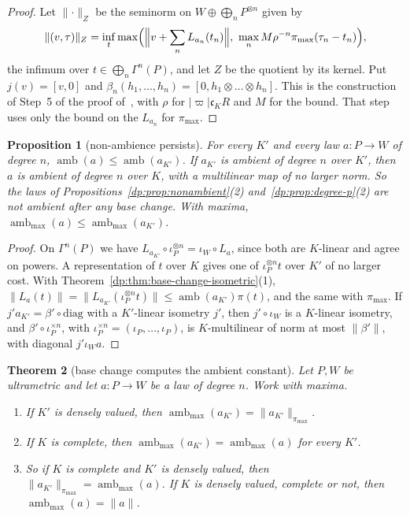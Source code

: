\documentclass[11pt]{amsart}
\newtheorem{theorem}{Theorem}[section]
\newtheorem{proposition}[theorem]{Proposition}
\theoremstyle{definition}
\theoremstyle{remark}
\numberwithin{equation}{section}
\newcommand{\abs}[1]{\lvert #1\rvert}
\newcommand{\norm}[1]{\lVert #1\rVert}
\theoremstyle{plain}
\theoremstyle{definition}
\theoremstyle{plain}
\begin{document}
\begin{proof}
Let $\norm\cdot_Z$ be the seminorm on $W\oplus\bigoplus_nP^{\otimes n}$ given by
\[
 \norm{(v,\tau)}_Z=\inf_t\max\Bigl(\Bigl\lVert v+\sum_nL_{a_n}(t_n)\Bigr\rVert,\ \max_nM\rho^{-n}\pi_{\max}(\tau_n-t_n)\Bigr),
\]
the infimum over $t\in\bigoplus_n\Gamma^n(P)$, and let $Z$ be the quotient by its kernel. Put $j(v)=[v,0]$ and $\beta_n(h_1,\dots,h_n)=[0,h_1\otimes\dots\otimes h_n]$. This is the construction of Step~5 of the proof of~\cite[Theorem~14.39]{I}, with $\rho$ for $\abs\varpi\mathfrak c_KR$ and $M$ for the bound. That step uses only the bound on the $L_{a_n}$ for $\pi_{\max}$.
\end{proof}

\begin{proposition}[non-ambience persists]\label{dp:prop:nonambient-base}
For every $K'$ and every law $a\colon P\to W$ of degree $n$, $\operatorname{amb}(a)\le\operatorname{amb}(a_{K'})$. If $a_{K'}$ is ambient of degree $n$ over $K'$, then $a$ is ambient of degree $n$ over $K$, with a multilinear map of no larger norm. So the laws of Propositions~\ref{dp:prop:nonambient}\textup{(2)} and~\ref{dp:prop:degree-p}\textup{(2)} are not ambient after any base change. With maxima, $\operatorname{amb}_{\max}(a)\le\operatorname{amb}_{\max}(a_{K'})$.
\end{proposition}

\begin{proof}
On $\Gamma^n(P)$ we have $L_{a_{K'}}\circ\iota_P^{\otimes n}=\iota_W\circ L_a$, since both are $K$-linear and agree on powers. A representation of $t$ over $K$ gives one of $\iota_P^{\otimes n}t$ over $K'$ of no larger cost. With Theorem~\ref{dp:thm:base-change-isometric}(1), $\norm{L_a(t)}=\norm{L_{a_{K'}}(\iota_P^{\otimes n}t)}\le\operatorname{amb}(a_{K'})\pi(t)$, and the same with $\pi_{\max}$. If $j'a_{K'}=\beta'\circ\mathrm{diag}$ with a $K'$-linear isometry $j'$, then $j'\circ\iota_W$ is a $K$-linear isometry, and $\beta'\circ\iota_P^{\times n}$, with $\iota_P^{\times n}=(\iota_P,\dots,\iota_P)$, is $K$-multilinear of norm at most $\norm{\beta'}$, with diagonal $j'\iota_Wa$.
\end{proof}

\begin{theorem}[base change computes the ambient constant]\label{dp:thm:base-change-amb}
Let $P,W$ be ultrametric and let $a\colon P\to W$ be a law of degree $n$. Work with maxima.
\begin{enumerate}
\item If $K'$ is densely valued, then $\operatorname{amb}_{\max}(a_{K'})=\norm{a_{K'}}_{\pi_{\max}}$.
\item If $K$ is complete, then $\operatorname{amb}_{\max}(a_{K'})=\operatorname{amb}_{\max}(a)$ for every $K'$.
\item So if $K$ is complete and $K'$ is densely valued, then $\norm{a_{K'}}_{\pi_{\max}}=\operatorname{amb}_{\max}(a)$. If $K$ is densely valued, complete or not, then $\operatorname{amb}_{\max}(a)=\norm a$.
\end{enumerate}
\end{theorem}
\end{document}
